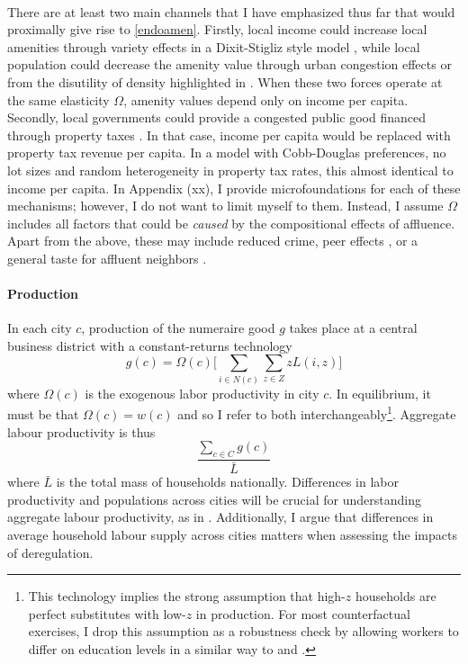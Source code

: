 \documentclass[]{article}
\begin{document}
 \paragraph*{}
There are at least two main channels that I have emphasized thus far that would proximally give rise to \eqref{endoamen}. Firstly, local income could increase local amenities through variety effects in a Dixit-Stigliz style model \citep{AlmagroDI, Coutureetal}, while local population could decrease the amenity value through urban congestion effects or from the disutility of density highlighted in \citep{KSC}. When these two forces operate at the same elasticity $\Omega$, amenity values depend only on income per capita. Secondly, local governments could provide a congested public good financed through property taxes \citep{calabresetal}. In that case, income per capita would be replaced with property tax revenue per capita. In a model with Cobb-Douglas preferences, no lot sizes and random heterogeneity in property tax rates, this almost identical to income per capita. In Appendix (xx), I provide microfoundations for each of these mechanisms; however, I do not want to limit myself to them. Instead, I assume $\Omega$ includes all factors that could be \textit{caused} by the compositional effects of affluence. Apart from the above, these may include reduced crime, peer effects \citep{chettyhendren}, or a general taste for affluent neighbors \citep{ghh2013, parispoor}.

\paragraph*{Production} In each city $c$, production of the numeraire good $g$ takes place at a central business district with a constant-returns technology
\begin{equation}\label{production}
	g(c) = \Omega(c)\bigg[\sum_{i \in N(c)}\sum_{z \in Z}zL(i, z)\bigg]
\end{equation}
where $\Omega(c)$ is the exogenous labor productivity in city $c$. In equilibrium, it must be that $\Omega(c) = w(c)$ and so I refer to both interchangeably\footnote{This technology implies the strong assumption that high-$z$ households are perfect substitutes with low-$z$ in production. For most counterfactual exercises, I drop this assumption as a robustness check by allowing workers to differ on education levels in a similar way to \cite{diamond2016} and \cite{ineqincreased}.}. Aggregate labour productivity is thus 
\begin{equation*}
	\frac{\sum_{c \in C}g(c)}{\bar{L}}
\end{equation*}
 where $\bar{L}$ is the total mass of households nationally. Differences in labor productivity and populations across cities will be crucial for understanding aggregate labour productivity, as in \cite{hseihmoretti}. Additionally, I argue that differences in average household labour supply across cities matters when assessing the impacts of deregulation.
\end{document}
